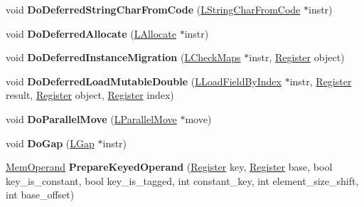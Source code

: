 \begin{DoxyCompactItemize}
\item 
void {\bfseries Do\+Deferred\+String\+Char\+From\+Code} (\hyperlink{classv8_1_1internal_1_1_l_string_char_from_code}{L\+String\+Char\+From\+Code} $\ast$instr)\hypertarget{classv8_1_1internal_1_1_l_code_gen_acf78c92290237e368a4b178f049afbc6}{}\label{classv8_1_1internal_1_1_l_code_gen_acf78c92290237e368a4b178f049afbc6}

\item 
void {\bfseries Do\+Deferred\+Allocate} (\hyperlink{classv8_1_1internal_1_1_l_allocate}{L\+Allocate} $\ast$instr)\hypertarget{classv8_1_1internal_1_1_l_code_gen_a5a708933d9b086e295c8bf902f66033e}{}\label{classv8_1_1internal_1_1_l_code_gen_a5a708933d9b086e295c8bf902f66033e}

\item 
void {\bfseries Do\+Deferred\+Instance\+Migration} (\hyperlink{classv8_1_1internal_1_1_l_check_maps}{L\+Check\+Maps} $\ast$instr, \hyperlink{structv8_1_1internal_1_1_register}{Register} object)\hypertarget{classv8_1_1internal_1_1_l_code_gen_a9a11a557dc4a35165efe7432b91cce0c}{}\label{classv8_1_1internal_1_1_l_code_gen_a9a11a557dc4a35165efe7432b91cce0c}

\item 
void {\bfseries Do\+Deferred\+Load\+Mutable\+Double} (\hyperlink{classv8_1_1internal_1_1_l_load_field_by_index}{L\+Load\+Field\+By\+Index} $\ast$instr, \hyperlink{structv8_1_1internal_1_1_register}{Register} result, \hyperlink{structv8_1_1internal_1_1_register}{Register} object, \hyperlink{structv8_1_1internal_1_1_register}{Register} index)\hypertarget{classv8_1_1internal_1_1_l_code_gen_a9a814347358bb30ae26293358697e12f}{}\label{classv8_1_1internal_1_1_l_code_gen_a9a814347358bb30ae26293358697e12f}

\item 
void {\bfseries Do\+Parallel\+Move} (\hyperlink{classv8_1_1internal_1_1_l_parallel_move}{L\+Parallel\+Move} $\ast$move)\hypertarget{classv8_1_1internal_1_1_l_code_gen_ac76d169118f379bb8eb597ec360ca6e1}{}\label{classv8_1_1internal_1_1_l_code_gen_ac76d169118f379bb8eb597ec360ca6e1}

\item 
void {\bfseries Do\+Gap} (\hyperlink{classv8_1_1internal_1_1_l_gap}{L\+Gap} $\ast$instr)\hypertarget{classv8_1_1internal_1_1_l_code_gen_a349f26d8f5d21ea5ef25e7855317a575}{}\label{classv8_1_1internal_1_1_l_code_gen_a349f26d8f5d21ea5ef25e7855317a575}

\item 
\hyperlink{classv8_1_1internal_1_1_mem_operand}{Mem\+Operand} {\bfseries Prepare\+Keyed\+Operand} (\hyperlink{structv8_1_1internal_1_1_register}{Register} key, \hyperlink{structv8_1_1internal_1_1_register}{Register} base, bool key\+\_\+is\+\_\+constant, bool key\+\_\+is\+\_\+tagged, int constant\+\_\+key, int element\+\_\+size\+\_\+shift, int base\+\_\+offset)\hypertarget{classv8_1_1internal_1_1_l_code_gen_ae91a85fa77357a6e8668bc037407594b}{}\label{classv8_1_1internal_1_1_l_code_gen_ae91a85fa77357a6e8668bc037407594b}


\end{DoxyCompactItemize}
